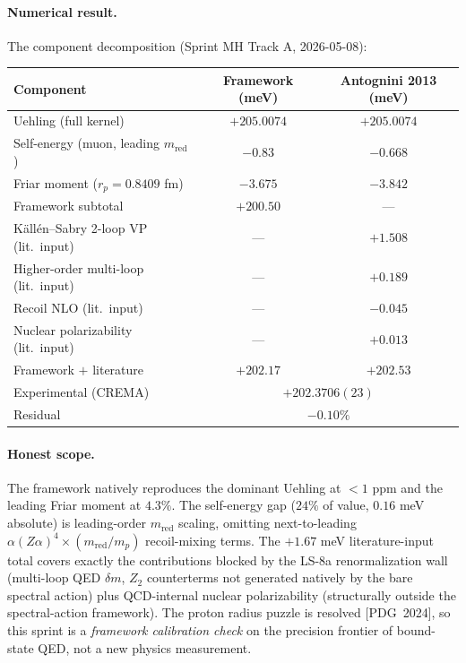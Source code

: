 \documentclass[11pt]{article}
\begin{document}
\paragraph{Numerical result.}  The component decomposition
(Sprint MH Track A, 2026-05-08):

\begin{tabular}{lcc}
\toprule
Component & Framework (meV) & Antognini 2013 (meV) \\
\midrule
Uehling (full kernel) & $+205.0074$ & $+205.0074$ \\
Self-energy (muon, leading $m_\text{red}$) & $-0.83$ & $-0.668$ \\
Friar moment ($r_p = 0.8409$ fm) & $-3.675$ & $-3.842$ \\
\midrule
Framework subtotal & $+200.50$ & --- \\
\midrule
K\"all\'en--Sabry 2-loop VP (lit.\ input) & --- & $+1.508$ \\
Higher-order multi-loop (lit.\ input) & --- & $+0.189$ \\
Recoil NLO (lit.\ input) & --- & $-0.045$ \\
Nuclear polarizability (lit.\ input) & --- & $+0.013$ \\
\midrule
Framework $+$ literature & $+202.17$ & $+202.53$ \\
\midrule
Experimental (CREMA) & \multicolumn{2}{c}{$+202.3706(23)$} \\
Residual & \multicolumn{2}{c}{$-0.10\%$} \\
\bottomrule
\end{tabular}

\paragraph{Honest scope.}  The framework natively reproduces the
dominant Uehling at $<1$ ppm and the leading Friar moment at $4.3\%$.
The self-energy gap ($24\%$ of value, $0.16$ meV absolute) is
leading-order $m_\text{red}$ scaling, omitting next-to-leading
$\alpha(Z\alpha)^4 \times (m_\text{red}/m_p)$ recoil-mixing terms.
The $+1.67$ meV literature-input total covers exactly the contributions
blocked by the LS-8a renormalization wall (multi-loop QED $\delta m$,
$Z_2$ counterterms not generated natively by the bare spectral action)
plus QCD-internal nuclear polarizability (structurally outside the
spectral-action framework).  The proton radius puzzle is resolved
[PDG~2024], so this sprint is a \emph{framework calibration check} on
the precision frontier of bound-state QED, not a new physics
measurement.
\end{document}
